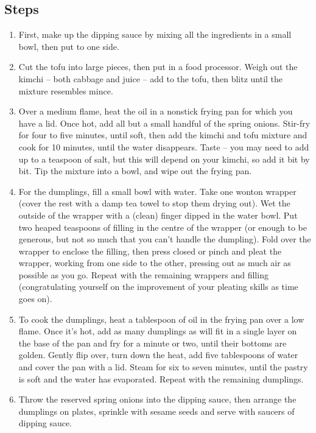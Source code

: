 \documentclass{book}
\begin{document}
\subsection*{Steps}
\begin{enumerate}
\item First, make up the dipping sauce by mixing all the ingredients in a small bowl, then put to one side.
\item Cut the tofu into large pieces, then put in a food processor. Weigh out the kimchi – both cabbage and juice – add to the tofu, then blitz until the mixture resembles mince.
\item Over a medium flame, heat the oil in a nonstick frying pan for which you have a lid. Once hot, add all but a small handful of the spring onions. Stir-fry for four to five minutes, until soft, then add the kimchi and tofu mixture and cook for 10 minutes, until the water disappears. Taste – you may need to add up to a teaspoon of salt, but this will depend on your kimchi, so add it bit by bit. Tip the mixture into a bowl, and wipe out the frying pan.
\item For the dumplings, fill a small bowl with water. Take one wonton wrapper (cover the rest with a damp tea towel to stop them drying out). Wet the outside of the wrapper with a (clean) finger dipped in the water bowl. Put two heaped teaspoons of filling in the centre of the wrapper (or enough to be generous, but not so much that you can’t handle the dumpling). Fold over the wrapper to enclose the filling, then press closed or pinch and pleat the wrapper, working from one side to the other, pressing out as much air as possible as you go. Repeat with the remaining wrappers and filling (congratulating yourself on the improvement of your pleating skills as time goes on).
\item To cook the dumplings, heat a tablespoon of oil in the frying pan over a low flame. Once it’s hot, add as many dumplings as will fit in a single layer on the base of the pan and fry for a minute or two, until their bottoms are golden. Gently flip over, turn down the heat, add five tablespoons of water and cover the pan with a lid. Steam for six to seven minutes, until the pastry is soft and the water has evaporated. Repeat with the remaining dumplings.
\item Throw the reserved spring onions into the dipping sauce, then arrange the dumplings on plates, sprinkle with sesame seeds and serve with saucers of dipping sauce.
\end{enumerate}
\newpage
\end{document}
